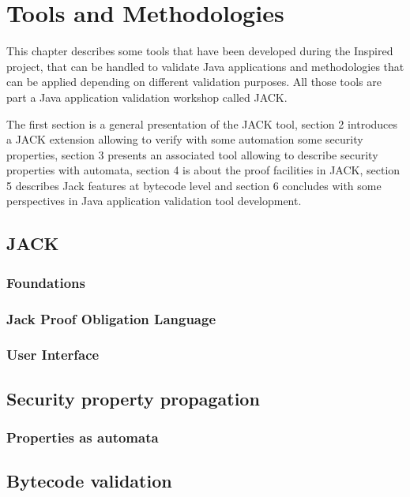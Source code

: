 \chapter{Tools and Methodologies}
This chapter describes some tools that have been developed during the Inspired project, that can be handled to validate Java applications and methodologies that can be applied depending on different validation purposes.
All those tools are part a Java application validation workshop called JACK.

The first section is a general presentation of the JACK tool, section 2 introduces a JACK extension allowing to verify with some automation some security properties, section 3 presents an associated tool allowing to describe security properties with automata, section 4 is about the proof facilities in JACK, section 5 describes Jack features at bytecode level and section 6 concludes with some perspectives in Java application validation tool development.
\section{JACK}

\subsection{Foundations}

\subsection{Jack Proof Obligation Language}

\subsection{User Interface}

%
%

\section{Security property propagation}


%
%

\subsection{Properties as automata}


\section{Bytecode validation}






%

%

